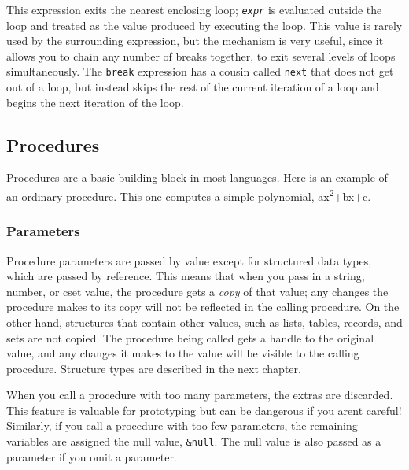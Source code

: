 This expression exits the nearest enclosing loop; \texttt{\textit{expr}}
is evaluated outside the loop and treated as the value produced by
executing the loop. This value is rarely used by the surrounding
expression, but the mechanism is very useful, since it allows you to
chain any number of breaks together, to exit several levels of loops
simultaneously. The \texttt{break} expression has a cousin called
\texttt{next} that does not get out of a loop, but instead skips the
rest of the current iteration of a loop and begins the next iteration
of the loop.

\subsection[Procedures]{Procedures}
Procedures are a basic building block in most
languages. Here is an example of an ordinary procedure. This one
computes a simple polynomial, ax\textsuperscript{2}+bx+c.


\subsubsection{Parameters}

Procedure parameters are passed by value except for
structured data types, which are passed by
reference. This means that when you pass in a string,
number, or cset value, the procedure gets a \textit{copy} of that
value; any changes the procedure makes to its copy will not be
reflected in the calling procedure. On the other hand, structures that
contain other values, such as lists, tables, records, and sets are not
copied. The procedure being called gets a handle to the original value,
and any changes it makes to the value will be visible to the calling
procedure. Structure types are described in the next chapter.

When you call a procedure with too many
parameters, the extras are discarded. This feature is valuable for
prototyping but can be dangerous if you aren{\textquotesingle}t
careful! Similarly, if you call a procedure with too few parameters,
the remaining variables are assigned the null value, \texttt{\&null}.
The null value is also passed as a parameter if you omit a parameter.

